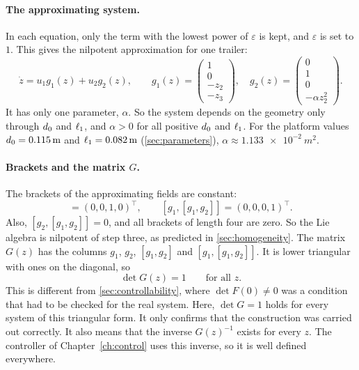 \paragraph{The approximating system.}
In each equation, only the term with the lowest power of $\varepsilon$ is kept,
and $\varepsilon$ is set to $1$. This gives the nilpotent approximation for one
trailer:
\begin{equation}
  \dot z=u_1g_1(z)+u_2g_2(z),\qquad
  g_1(z)=\begin{pmatrix}1\\0\\-z_2\\-z_3\end{pmatrix},\quad
  g_2(z)=\begin{pmatrix}0\\1\\0\\-\alpha z_2^{2}\end{pmatrix}.
  \label{eq:nilp1}
\end{equation}
It has only one parameter, $\alpha$. So the system depends on the geometry only
through $d_0$ and $\ell_1$, and $\alpha>0$ for all positive $d_0$ and
$\ell_1$. For the platform values $d_0=\SI{0.115}{m}$ and
$\ell_1=\SI{0.082}{m}$ (\cref{sec:parameters}), $\alpha\approx\SI{1.133e-2}{m^2}$.

\paragraph{Brackets and the matrix $G$.}
The brackets of the approximating fields are constant:
\begin{equation}
  [g_1,g_2]=(0,0,1,0)^\top,\qquad
  [g_1,[g_1,g_2]]=(0,0,0,1)^\top .
\end{equation}
Also, $[g_2,[g_1,g_2]]=0$, and all brackets of length four are zero. So the Lie
algebra is nilpotent of step three, as predicted in \cref{sec:homogeneity}.
The matrix $G(z)$ has the columns $g_1$, $g_2$, $[g_1,g_2]$ and
$[g_1,[g_1,g_2]]$. It is lower triangular with ones on the diagonal, so
\begin{equation}
  \det G(z)=1\qquad\text{for all }z .
  \label{eq:detG}
\end{equation}
This is different from \cref{sec:controllability}, where $\det F(0)\ne0$ was a
condition that had to be checked for the real system. Here, $\det G=1$ holds for
every system of this triangular form. It only confirms that the construction was
carried out correctly. It also means that the inverse $G(z)^{-1}$ exists for
every $z$. The controller of Chapter~\ref{ch:control} uses this inverse, so it is
well defined everywhere.

